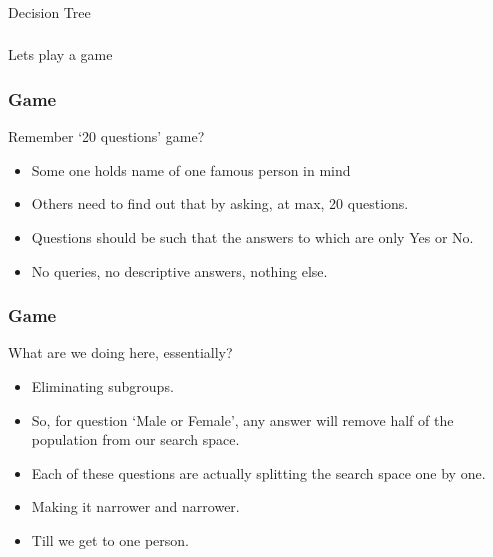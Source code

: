 \begin{frame}[fragile]\frametitle{}
\begin{center}
{\Large Decision Tree}
\end{center}
\end{frame}


\begin{frame}[fragile]\frametitle{}
\begin{center}
{\Large Lets play a game}
\end{center}
\end{frame}


\begin{frame}[fragile]\frametitle{Game}
Remember `20 questions' game?
\begin{itemize}
	\item Some one holds name of one famous person in mind
	\item Others need to find out that by asking, at max, 20 questions.
	\item Questions should be such that the answers to which are only Yes or No.
	\item No queries, no descriptive answers, nothing else.
	\end{itemize}
\end{frame}

\begin{frame}[fragile]\frametitle{Game}
What are we doing here, essentially?
\begin{itemize}
	\item Eliminating subgroups.
	\item So, for question `Male or Female', any answer will remove half of the population from our search space.
	\item Each of these questions are actually splitting the search space one by one.
	\item Making it narrower and narrower.
	\item Till we get to one person.
	\end{itemize}
\end{frame}


